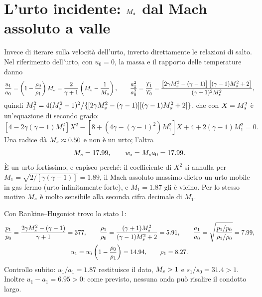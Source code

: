 \section*{L'urto incidente: $M_{s}$ dal Mach assoluto a valle}
Invece di iterare sulla velocità dell'urto, inverto direttamente le relazioni di salto. Nel riferimento dell'urto,
con $u_0=0$, la massa e il rapporto delle temperature danno
\begin{gather*}
  \frac{u_1}{a_0}=\left(1-\frac{\rho_0}{\rho_1}\right)M_{s}=\frac{2}{\gamma+1}\left(M_{s}-\frac1{M_{s}}\right),\qquad
  \frac{a_1^2}{a_0^2}=\frac{T_1}{T_0}=\frac{\left[2\gamma M_{s}^2-(\gamma-1)\right]\left[(\gamma-1)M_{s}^2+2\right]}{(\gamma+1)^2M_{s}^2},
\end{gather*}
quindi $M_1^2=4(M_{s}^2-1)^2\big/\{[2\gamma M_{s}^2-(\gamma-1)][(\gamma-1)M_{s}^2+2]\}$, che con $X=M_{s}^2$ è un'equazione di
secondo grado:
\[
  \left[4-2\gamma(\gamma-1)M_1^2\right]X^2-\left[8+\left(4\gamma-(\gamma-1)^2\right)M_1^2\right]X+4+2(\gamma-1)M_1^2=0 .
\]
Una radice dà $M_{s}\approx\num{0.50}$ e non è un urto; l'altra
\[
  M_{s}=\num{17.99},\qquad w_i=M_{s} a_0=\num{17.99}.
\]
È un urto fortissimo, e capisco perché: il coefficiente di $X^2$ si annulla per $M_1=\sqrt{2/[\gamma(\gamma-1)]}=\num{1.89}$,
il Mach assoluto massimo dietro un urto mobile in gas fermo (urto infinitamente forte), e $M_1=\num{1.87}$ gli è
vicino. Per lo stesso motivo $M_{s}$ è molto sensibile alla seconda cifra decimale di $M_1$.

Con Rankine--Hugoniot trovo lo stato 1:
\begin{gather*}
  \frac{p_1}{p_0}=\frac{2\gamma M_{s}^2-(\gamma-1)}{\gamma+1}=\num{377},\qquad
  \frac{\rho_1}{\rho_0}=\frac{(\gamma+1)M_{s}^2}{(\gamma-1)M_{s}^2+2}=\num{5.91},\qquad
  \frac{a_1}{a_0}=\sqrt{\frac{p_1/p_0}{\rho_1/\rho_0}}=\num{7.99},\\
  u_1=w_i\left(1-\frac{\rho_0}{\rho_1}\right)=\num{14.94},\qquad \rho_1=\num{8.27}.
\end{gather*}
Controllo subito: $u_1/a_1=\num{1.87}$ restituisce il dato, $M_{s}>1$ e $s_1/s_0=\num{31.4}>1$. Inoltre
$u_1-a_1=\num{6.95}>0$: come previsto, nessuna onda può risalire il condotto largo.

